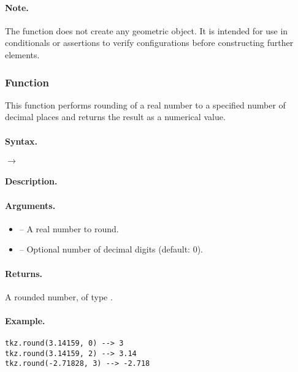 \paragraph{Note.}
The function does not create any geometric object. It is intended for use in conditionals or assertions to verify configurations before constructing further elements.

\subsubsection{Function }
\label{ssub:function_tkz_round}

This function performs rounding of a real number to a specified number of decimal places and returns the result as a numerical value.

\paragraph{Syntax.}
\begin{center}
 \hspace{4em} $\rightarrow$ 
\end{center}

\paragraph{Description.}


\paragraph{Arguments.}
\begin{itemize}
\item {} – A real number to round.
\item {} – Optional number of decimal digits (default: 0).
\end{itemize}

\paragraph{Returns.}
A rounded number, of type .

\paragraph{Example.}
\begin{verbatim}
tkz.round(3.14159, 0) --> 3
tkz.round(3.14159, 2) --> 3.14
tkz.round(-2.71828, 3) --> -2.718
\end{verbatim}

